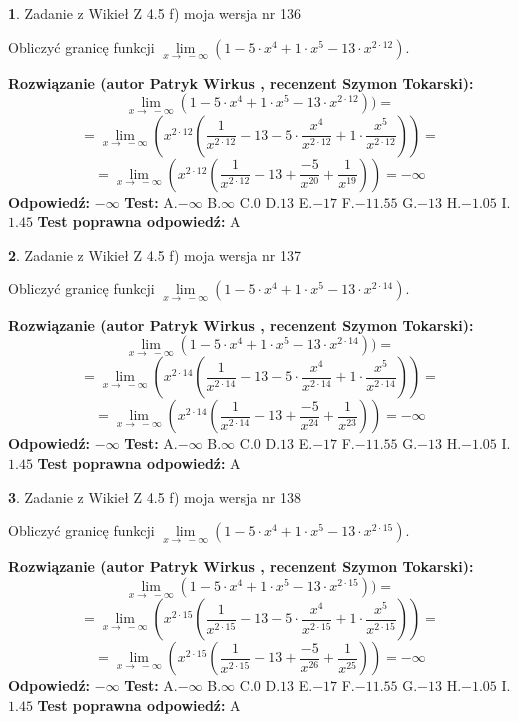 \documentclass[12pt, a4paper]{article}
\theoremstyle{definition} %
\newtheorem{zad}{}
\newcommand{\zadStart}[1]{\begin{zad}#1\newline}
\newcommand{\zadStop}{\end{zad}}
\newcommand{\rozwStart}[2]{\noindent \textbf{Rozwiązanie (autor #1 , recenzent #2): }\newline}
\newcommand{\rozwStop}{\newline}
\newcommand{\odpStart}{\noindent \textbf{Odpowiedź:}\newline}
\newcommand{\odpStop}{\newline}
\newcommand{\testStart}{\noindent \textbf{Test:}\newline}
\newcommand{\testStop}{\newline}
\newcommand{\kluczStart}{\noindent \textbf{Test poprawna odpowiedź:}\newline}
\newcommand{\kluczStop}{\newline}
\begin{document}
\zadStart{Zadanie z Wikieł Z 4.5 f) moja wersja nr 136}


Obliczyć granicę funkcji  $\lim\limits_{x\to\ -\infty}(1 - 5 \cdot x^{4}+1 \cdot x^{5}- 13 \cdot x^{2\cdot12})$.
\zadStop
\rozwStart{Patryk Wirkus}{Szymon Tokarski}
$$\lim\limits_{x\to\ -\infty}(1 - 5 \cdot x^{4}+1 \cdot x^{5}- 13 \cdot x^{2\cdot12}))=$$
$$=\lim\limits_{x\to\ -\infty}(x^{2\cdot12}(\frac{1}{x^{2\cdot12}}-13 -5 \cdot \frac{x^{4}}{x^{2\cdot12}}+1 \cdot \frac{x^{5}}{x^{2\cdot12}}))=$$
$$=\lim\limits_{x\to\ -\infty}(x^{2\cdot12}(\frac{1}{x^{2\cdot12}}-13 + \frac{-5}{x^{20}}+ \frac{1}{x^{19}}))=-\infty$$
\rozwStop
\odpStart
$-\infty$
\odpStop
\testStart
A.$-\infty$ B.$\infty$ C.$0$ D.$13$ E.$-17$
F.$-11.55$ G.$-13$
H.$-1.05$
I.$1.45$
\testStop
\kluczStart
A
\kluczStop



\zadStart{Zadanie z Wikieł Z 4.5 f) moja wersja nr 137}


Obliczyć granicę funkcji  $\lim\limits_{x\to\ -\infty}(1 - 5 \cdot x^{4}+1 \cdot x^{5}- 13 \cdot x^{2\cdot14})$.
\zadStop
\rozwStart{Patryk Wirkus}{Szymon Tokarski}
$$\lim\limits_{x\to\ -\infty}(1 - 5 \cdot x^{4}+1 \cdot x^{5}- 13 \cdot x^{2\cdot14}))=$$
$$=\lim\limits_{x\to\ -\infty}(x^{2\cdot14}(\frac{1}{x^{2\cdot14}}-13 -5 \cdot \frac{x^{4}}{x^{2\cdot14}}+1 \cdot \frac{x^{5}}{x^{2\cdot14}}))=$$
$$=\lim\limits_{x\to\ -\infty}(x^{2\cdot14}(\frac{1}{x^{2\cdot14}}-13 + \frac{-5}{x^{24}}+ \frac{1}{x^{23}}))=-\infty$$
\rozwStop
\odpStart
$-\infty$
\odpStop
\testStart
A.$-\infty$ B.$\infty$ C.$0$ D.$13$ E.$-17$
F.$-11.55$ G.$-13$
H.$-1.05$
I.$1.45$
\testStop
\kluczStart
A
\kluczStop



\zadStart{Zadanie z Wikieł Z 4.5 f) moja wersja nr 138}


Obliczyć granicę funkcji  $\lim\limits_{x\to\ -\infty}(1 - 5 \cdot x^{4}+1 \cdot x^{5}- 13 \cdot x^{2\cdot15})$.
\zadStop
\rozwStart{Patryk Wirkus}{Szymon Tokarski}
$$\lim\limits_{x\to\ -\infty}(1 - 5 \cdot x^{4}+1 \cdot x^{5}- 13 \cdot x^{2\cdot15}))=$$
$$=\lim\limits_{x\to\ -\infty}(x^{2\cdot15}(\frac{1}{x^{2\cdot15}}-13 -5 \cdot \frac{x^{4}}{x^{2\cdot15}}+1 \cdot \frac{x^{5}}{x^{2\cdot15}}))=$$
$$=\lim\limits_{x\to\ -\infty}(x^{2\cdot15}(\frac{1}{x^{2\cdot15}}-13 + \frac{-5}{x^{26}}+ \frac{1}{x^{25}}))=-\infty$$
\rozwStop
\odpStart
$-\infty$
\odpStop
\testStart
A.$-\infty$ B.$\infty$ C.$0$ D.$13$ E.$-17$
F.$-11.55$ G.$-13$
H.$-1.05$
I.$1.45$
\testStop
\kluczStart
A
\kluczStop
\end{document}
